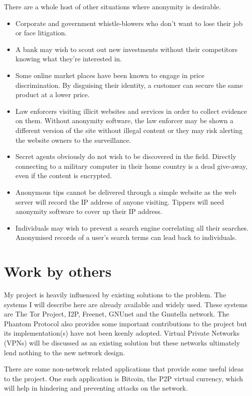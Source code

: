 \documentclass[ %
                    author={Luke Murray},
                supervisor={Dr. Simon Hollis},
                     title={Shadow Peer-to-Peer Networks},
                  subtitle={},
                    degree={MEng},
                      year={2013} ]{thesis}
\begin{document}
There are a whole host of other situations where anonymity is desirable.
\begin{itemize}
\item Corporate and government whistle-blowers who don't want to lose their job or face litigation.
\item A bank may wish to scout out new investments without their competitors knowing what they're interested in.
\item Some online market places have been known to engage in price discrimination. By disguising their identity, a customer can secure the same product at a lower price.
\item Law enforcers visiting illicit websites and services in order to collect evidence on them. Without anonymity software, the law enforcer may be shown a different version of the site without illegal content or they may risk alerting the website owners to the surveillance.
\item Secret agents obviously do not wish to be discovered in the field. Directly connecting to a military computer in their home country is a dead give-away, even if the content is encrypted.
\item Anonymous tips cannot be delivered through a simple website as the web server will record the IP address of anyone visiting. Tippers will need anonymity software to cover up their IP address.
\item Individuals may wish to prevent a search engine correlating all their searches. Anonymised records of a user's search terms can lead back to individuals\cite{Aol}.
\end{itemize}

\section{Work by others}

My project is heavily influenced by existing solutions to the problem. The systems I will describe here are already available and widely used. These systems are The Tor Project\cite{Tor}, I2P\cite{I2P}, Freenet\cite{Freenet}, GNUnet\cite{GNUnet} and the Gnutella network\cite{Gnutella}. The Phantom Protocol\cite{Phantom} also provides some important contributions to the project but its implementation(s) have not been keenly adopted. Virtual Private Networks (VPNs) will be discussed as an existing solution but these networks ultimately lend nothing to the new network design. 

There are some non-network related applications that provide some useful ideas to the project. One such application is Bitcoin, the P2P virtual currency, which will help in hindering and preventing attacks on the network. 
\end{document}
